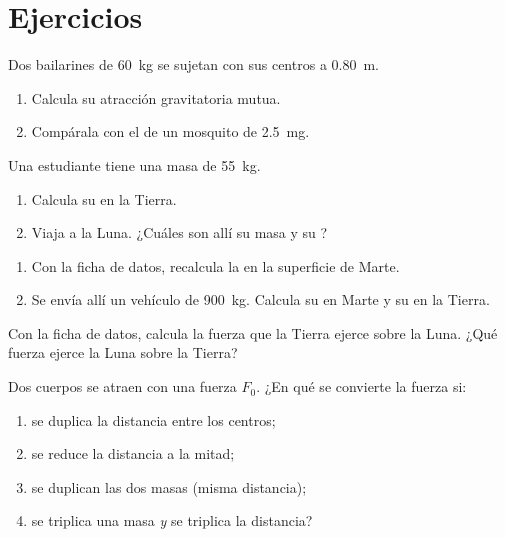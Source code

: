 \section{Ejercicios}

\begin{exercise}[$\star$]\label{exo:g10:universal-gravitation:1}
Dos bailarines de \qty{60}{kg} se sujetan con sus centros a
\qty{0.80}{m}.
\begin{enumerate}
  \item Calcula su atracción gravitatoria mutua.
  \item Compárala con el  de un mosquito de \qty{2.5}{mg}.
\end{enumerate}
\end{exercise}

\begin{exercise}[$\star$]\label{exo:g10:universal-gravitation:2}
Una estudiante tiene una masa de \qty{55}{kg}.
\begin{enumerate}
  \item Calcula su  en la Tierra.
  \item Viaja a la Luna. ¿Cuáles son allí su masa y su ?
\end{enumerate}
\end{exercise}

\begin{exercise}[$\star$]\label{exo:g10:universal-gravitation:3}
\begin{enumerate}
  \item Con la ficha de datos, recalcula la  en la superficie de Marte.
  \item Se envía allí un vehículo de \qty{900}{kg}. Calcula su  en
        Marte y su  en la Tierra.
\end{enumerate}
\end{exercise}

\begin{exercise}[$\star$]\label{exo:g10:universal-gravitation:4}
Con la ficha de datos, calcula la fuerza que la Tierra ejerce sobre la
Luna. ¿Qué fuerza ejerce la Luna sobre la Tierra?
\end{exercise}

\begin{exercise}[$\star$]\label{exo:g10:universal-gravitation:5}
Dos cuerpos se atraen con una fuerza $F_0$. ¿En qué se convierte la
fuerza si:
\begin{enumerate}
  \item se duplica la distancia entre los centros;
  \item se reduce la distancia a la mitad;
  \item se duplican las dos masas (misma distancia);
  \item se triplica una masa \emph{y} se triplica la distancia?
\end{enumerate}
\end{exercise}

